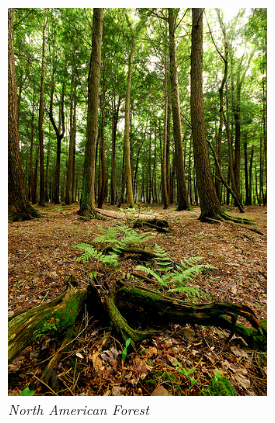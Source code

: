 \begin{figure}
    \includegraphics[width=2.7in,height=4.04in]{images/forest.jpg}
    \vspace{-10pt}
  \caption{\textit{North American Forest}\label{fig:forest}}
\end{figure}
